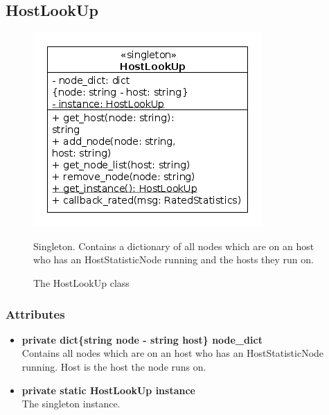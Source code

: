 \subsection{HostLookUp}
\begin{figure}[htbp]
	\begin{minipage}[t]{8cm}
		\vspace{0pt}
		\centering
		\includegraphics[scale=0.6]{./diagram_pictures/reactor/HostLookUp.png}
		\caption{The HostLookUp class}
	\end{minipage}
	\hfill
	\begin{minipage}[t]{8cm}
		\vspace{10pt}
			Singleton. Contains a dictionary of all nodes which are on an host who has an HostStatisticNode running and the hosts they run on.
	\end{minipage}
\end{figure}  


\subsubsection{Attributes}
\begin{itemize}
	\item \textbf{ private dict\{string node - string host\} node\_dict }\\
		Contains all nodes which are on an host who has an HostStatisticNode running. Host is the host the node runs on.
	\item \textbf{ private static HostLookUp instance }\\
		The singleton instance.
\end{itemize}
